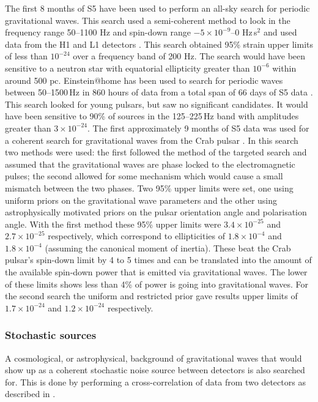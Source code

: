 \documentclass{article}
\begin{document}
The first 8 months of S5 have been used to perform an all-sky search for
periodic gravitational waves. This search used a semi-coherent method to look
in the frequency range 50--1100 Hz and spin-down range $-5\times10^{-9}$--0
Hz\,s$^2$ and used data from the H1 and L1 detectors \cite{Abbott:2008i}. This
search obtained 95\% strain upper limits of less than $10^{-24}$ over a
frequency band of 200 Hz. The search would have been sensitive to a neutron star
with equatorial ellipticity greater than $10^{-6}$ within around 500 pc.
Einstein@home \cite{eath} has been used to search for periodic waves between
50--1500\,Hz in 860 hours of data from a total span of 66 days of S5 data
\cite{Abbott:2009a}. This search looked for young pulsars, but saw no
significant candidates. It would have been sensitive to 90\% of sources in the
125--225\,Hz band with amplitudes greater than $3\times10^{-24}$. The first
approximately 9 months of S5 data was used for a coherent search for
gravitational waves from the Crab pulsar \cite{Abbott:2008j}. In this search two
methods were used: the first followed the method of the targeted search and
assumed that the gravitational waves are phase locked to the electromagnetic
pulses; the second allowed for some mechanism which would cause a small mismatch
between the two phases. Two 95\% upper limits were set, one using uniform priors
on the gravitational wave parameters and the other using astrophysically
motivated priors on the pulsar orientation angle and polarisation angle. With
the first method these 95\% upper limits were $3.4\times10^{-25}$ and
$2.7\times10^{-25}$ respectively, which correspond to ellipticities of
$1.8\times10^{-4}$ and $1.8\times10^{-4}$ (assuming the canonical moment of
inertia). These beat the Crab pulsar's spin-down limit by 4 to 5 times and can
be translated into the amount of the available spin-down power that is
emitted via gravitational waves. The lower of these limits shows less than 4\%
of power is going into gravitational waves. For the second search the uniform
and restricted prior gave results upper limits of $1.7\times10^{-24}$ and
$1.2\times10^{-24}$ respectively.

\subsubsection{Stochastic sources}
A cosmological, or astrophysical, background of gravitational waves that would
show up as a coherent stochastic noise source between detectors is also searched
for. This is done by performing a cross-correlation of data from two detectors
as described in \cite{Allen:1999}.
\end{document}
